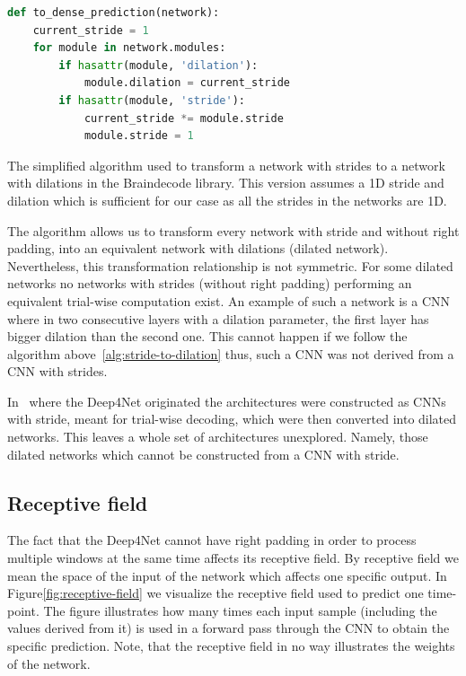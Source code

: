 \begin{algorithm}
\begin{lstlisting}[language=Python,label={lst:lstlisting}]
def to_dense_prediction(network):
	current_stride = 1
	for module in network.modules:
		if hasattr(module, 'dilation'):
			module.dilation = current_stride
		if hasattr(module, 'stride'):
			current_stride *= module.stride
			module.stride = 1
\end{lstlisting}
\caption{The simplified algorithm used to transform a network with strides to a network with dilations in the Braindecode library.
This version assumes a 1D stride and dilation which is sufficient for our case as all the strides in the networks are 1D.
}
\label{alg:stride-to-dilation}
\end{algorithm}

The algorithm allows us to transform every network with stride and without right padding, into an equivalent network with dilations (dilated network).
Nevertheless, this transformation relationship is not symmetric.
For some dilated networks no networks with strides (without right padding) performing an equivalent trial-wise computation exist.
An example of such a network is a CNN where in two consecutive layers with a dilation parameter, the first layer has bigger dilation than the second one.
This cannot happen if we follow the algorithm above~\ref{alg:stride-to-dilation} thus, such a CNN was not derived from a CNN with strides.

In~\cite{schirrmeister-deep-2017} where the Deep4Net originated the architectures were constructed as CNNs with stride, meant for trial-wise decoding, which were then converted into dilated networks.
This leaves a whole set of architectures unexplored.
Namely, those dilated networks which cannot be constructed from a CNN with stride.

\subsection{Receptive field}\label{subsec:receptive-field}
The fact that the Deep4Net cannot have right padding in order to process multiple windows at the same time affects its receptive field.
By receptive field we mean the space of the input of the network which affects one specific output.
In Figure\ref{fig:receptive-field} we visualize the receptive field used to predict one time-point.
The figure illustrates how many times each input sample (including the values derived from it) is used in a forward pass through the CNN to obtain the specific prediction.
Note, that the receptive field in no way illustrates the weights of the network.

